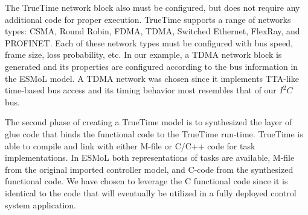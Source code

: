 The TrueTime network block also must be configured, but does not require any additional code for proper execution.  TrueTime supports a range of networks types: CSMA, Round Robin, FDMA, TDMA, Switched Ethernet, FlexRay, and PROFINET.  Each of these network types must be configured with bus speed, frame size, loss probability, etc.  In our example, a TDMA network block is generated and its properties are configured according to the bus information in the ESMoL model.  A TDMA network was chosen since it implements TTA-like time-based bus access and its timing behavior most resembles that of our $I^{2}C$ bus.

The second phase of creating a TrueTime model is to synthesized the layer of glue code that binds the functional code to the TrueTime run-time.  TrueTime is able to compile and link with either M-file or C/C++ code for task implementations.  In ESMoL both representations of tasks are available, M-file from the original imported controller model, and C-code from the synthesized functional code.  We have chosen to leverage the C functional code since it is identical to the code that will eventually be utilized in a fully deployed control system application.


